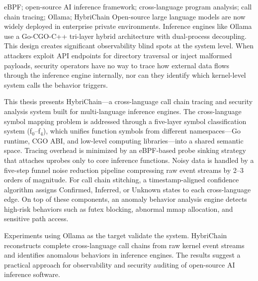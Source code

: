 \begin{abstractEng}{eBPF; open-source AI inference framework; cross-language program analysis; call chain tracing; Ollama; HybriChain}
Open-source large language models are now widely deployed in enterprise private environments. Inference engines like Ollama use a Go-CGO-C++ tri-layer hybrid architecture with dual-process decoupling. This design creates significant observability blind spots at the system level. When attackers exploit API endpoints for directory traversal or inject malformed payloads, security operators have no way to trace how external data flows through the inference engine internally, nor can they identify which kernel-level system calls the behavior triggers.

This thesis presents HybriChain---a cross-language call chain tracing and security analysis system built for multi-language inference engines. The cross-language symbol mapping problem is addressed through a five-layer symbol classification system (f$_0$--f$_4$), which unifies function symbols from different namespaces---Go runtime, CGO ABI, and low-level computing libraries---into a shared semantic space. Tracing overhead is minimized by an eBPF-based probe sinking strategy that attaches uprobes only to core inference functions. Noisy data is handled by a five-step funnel noise reduction pipeline compressing raw event streams by 2--3 orders of magnitude. For call chain stitching, a timestamp-aligned confidence algorithm assigns Confirmed, Inferred, or Unknown states to each cross-language edge. On top of these components, an anomaly behavior analysis engine detects high-risk behaviors such as futex blocking, abnormal mmap allocation, and sensitive path access.

Experiments using Ollama as the target validate the system. HybriChain reconstructs complete cross-language call chains from raw kernel event streams and identifies anomalous behaviors in inference engines. The results suggest a practical approach for observability and security auditing of open-source AI inference software.
\end{abstractEng}
